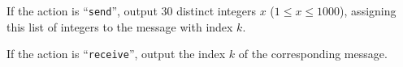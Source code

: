 
    If the action is ``\texttt{send}'', output $30$ distinct integers $x$ ($1\leq x\leq 1000$), assigning this list of integers to the message with index $k$.

    If the action is ``\texttt{receive}'', output the index $k$ of the corresponding message.
